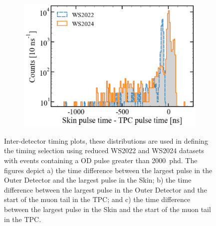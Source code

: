 \begin{figure}[h!]
\begin{subfigure}{0.5\textwidth}
    \includegraphics[width=\textwidth]{figures/Muons/Skin-TPC_timing.pdf}
    \caption{}
    \label{fig:Muons/Skin-TPC}
\end{subfigure}
\caption[Inter-detector timing plots used to define the muon flux timing selection.]{Inter-detector timing plots, these distributions are used in defining the timing selection using reduced WS2022 and WS2024 datasets with events containing a OD pulse greater than 2000~phd. The figures depict a) the time difference between the largest pulse in the Outer Detector and the largest pulse in the Skin; b) the time difference between the largest pulse in the Outer Detector and the start of the muon tail in the TPC; and c) the time difference between the largest pulse in the Skin and the start of the muon tail in the TPC.}
\label{fig:Muons/timing_plots}
\end{figure}

